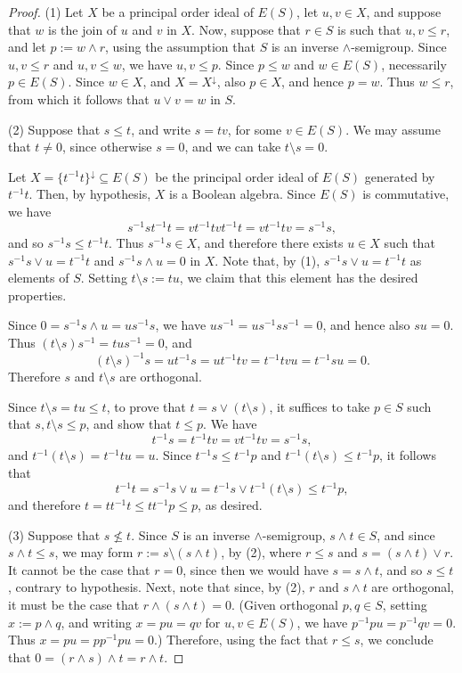 \documentclass[a4paper,reqno,12pt]{amsart}
\numberwithin{equation}{section}
\theoremstyle{plain}
\theoremstyle{definition}
\begin{document}
\begin{proof}
(1) Let $X$ be a principal order ideal of $E(S)$, let $u,v \in X$, and suppose that $w$ is the join of $u$ and $v$ in $X$. Now, suppose that $r \in S$ is such that $u, v \leq r$, and let $p := w \land r$, using the assumption that $S$ is an inverse $\land$-semigroup. Since $u, v \leq r$ and $u, v \leq w$, we have $u, v \leq p$. Since $p \leq w$ and $w \in E(S)$, necessarily $p \in E(S)$. Since $w \in X$, and $X = X^{\downarrow}$, also $p \in X$, and hence $p = w$. Thus $w \leq r$, from which it follows that $u \lor v = w$ in $S$.

\smallskip

(2) Suppose that $s\leq t$, and write $s = tv$, for some $v \in E(S)$. We may assume that $t \neq 0$, since otherwise $s=0$, and we can take $t\setminus s = 0$.

Let $X = \{t^{-1}t\}^{\downarrow} \subseteq E(S)$ be the principal order ideal of $E(S)$ generated by $t^{-1}t$. Then, by hypothesis, $X$ is a Boolean algebra. Since $E(S)$ is commutative, we have
\[s^{-1}st^{-1}t = vt^{-1}tvt^{-1}t = vt^{-1}tv = s^{-1}s,\] 
and so $s^{-1}s \leq t^{-1}t$. Thus $s^{-1}s \in X$, and therefore there exists $u \in X$ such that $s^{-1}s \lor u = t^{-1}t$ and $s^{-1}s \land u = 0$ in $X$. Note that, by (1), $s^{-1}s \lor u = t^{-1}t$ as elements of $S$. Setting $t \setminus s := tu$, we claim that this element has the desired properties.

Since $0 = s^{-1}s \land u  = us^{-1}s$, we have $us^{-1} = us^{-1}ss^{-1} = 0$, and hence also $su = 0$. Thus $(t\setminus s)s^{-1} = tus^{-1} = 0$, and 
\[(t\setminus s)^{-1}s = ut^{-1}s = ut^{-1}tv = t^{-1}tvu = t^{-1}su = 0.\]
Therefore $s$ and $t \setminus s$ are orthogonal.

Since $t \setminus s = tu \leq t$, to prove that $t = s \lor (t \setminus s)$, it suffices to take $p \in S$ such that $s, t \setminus s \leq p$, and show that $t \leq p$. We have 
\[t^{-1}s = t^{-1}tv = vt^{-1}tv = s^{-1}s,\]
and $t^{-1}(t \setminus s) = t^{-1}tu = u$. Since $t^{-1}s \leq t^{-1}p$ and $t^{-1}(t \setminus s) \leq t^{-1}p$, it follows that
\[t^{-1}t = s^{-1}s \lor u = t^{-1}s \lor t^{-1}(t \setminus s) \leq t^{-1}p,\]
and therefore $t = tt^{-1}t \leq tt^{-1}p \leq p$, as desired.

\smallskip

(3) Suppose that $s\not\leq t$. Since $S$ is an inverse $\land$-semigroup, $s \land t \in S$, and since $s \land t \leq s$, we may form $r := s\setminus (s\land t)$, by (2), where $r \leq s$ and $s = (s\land t) \lor r$. It cannot be the case that $r = 0$, since then we would have $s = s\land t$, and so $s \leq t$, contrary to hypothesis. Next, note that since, by (2), $r$ and $s \land t$ are orthogonal, it must be the case that $r\land (s\land t) = 0$. (Given orthogonal $p,q \in S$, setting $x := p \land q$, and writing $x=pu=qv$ for $u,v \in E(S)$, we have $p^{-1}pu = p^{-1}qv = 0$. Thus $x = pu = pp^{-1}pu = 0$.) Therefore, using the fact that $r \leq s$, we conclude that $0= (r\land s)\land t = r\land t$.
\end{proof}
\end{document}
